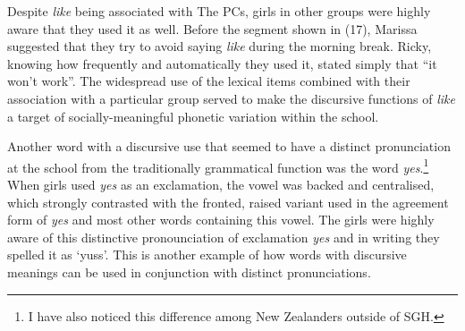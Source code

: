 Despite \textit{like} being associated with The PCs, girls in other groups were highly aware that they used it as well. Before the segment shown in (17), Marissa suggested that they try to avoid saying \textit{like} during the morning break. Ricky, knowing how frequently and automatically they used it, stated simply that ``it won't work''. The widespread use of the lexical items combined with their association with a particular group served to make the discursive functions of \textit{like} a target of socially-meaningful phonetic variation within the school.





Another word with a discursive use that seemed to have a distinct pronunciation at the school from the traditionally grammatical function was the word \textit{yes}.\footnote{I have also noticed this difference among New Zealanders outside of SGH.} When girls used \textit{yes} as an exclamation, the vowel was backed and centralised, which strongly contrasted with the fronted, raised variant used in the agreement form of \textit{yes} and most other words containing this vowel. The girls were highly aware of this distinctive pronounciation of exclamation \textit{yes} and in writing they spelled it as `yuss'. This is another example of how words with discursive meanings can be used in conjunction with distinct pronunciations.


